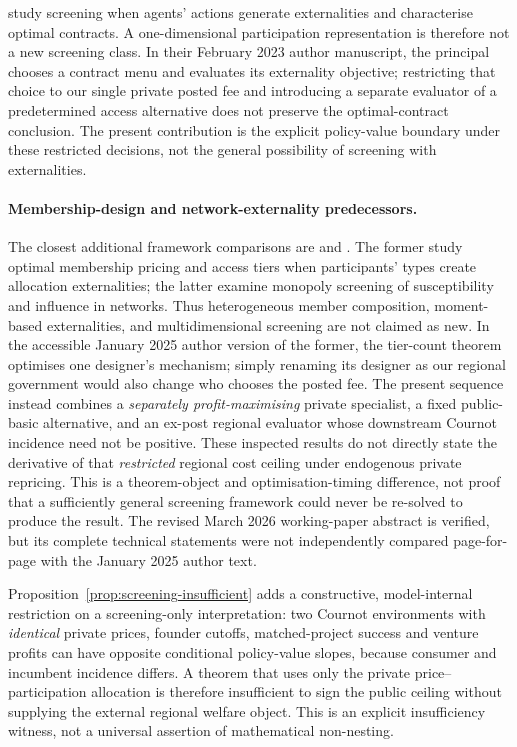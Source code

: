 \citet{OstrizekSartori2023} study screening when agents' actions generate externalities and characterise optimal contracts. A one-dimensional participation representation is therefore not a new screening class. In their February 2023 author manuscript, the principal chooses a contract menu and evaluates its externality objective; restricting that choice to our single private posted fee and introducing a separate evaluator of a predetermined access alternative does not preserve the optimal-contract conclusion. The present contribution is the explicit policy-value boundary under these restricted decisions, not the general possibility of screening with externalities.

\paragraph{Membership-design and network-externality predecessors.}
The closest additional framework comparisons are \citet{DworczakReuterKominersLee2026} and \citet{ShiXing2020}. The former study optimal membership pricing and access tiers when participants' types create allocation externalities; the latter examine monopoly screening of susceptibility and influence in networks. Thus heterogeneous member composition, moment-based externalities, and multidimensional screening are not claimed as new. In the accessible January 2025 author version of the former, the tier-count theorem optimises one designer's mechanism; simply renaming its designer as our regional government would also change who chooses the posted fee. The present sequence instead combines a \emph{separately profit-maximising} private specialist, a fixed public-basic alternative, and an ex-post regional evaluator whose downstream Cournot incidence need not be positive. These inspected results do not directly state the derivative of that \emph{restricted} regional cost ceiling under endogenous private repricing. This is a theorem-object and optimisation-timing difference, not proof that a sufficiently general screening framework could never be re-solved to produce the result. The revised March 2026 working-paper abstract is verified, but its complete technical statements were not independently compared page-for-page with the January 2025 author text.

Proposition~\ref{prop:screening-insufficient} adds a constructive, model-internal restriction on a screening-only interpretation: two Cournot environments with \emph{identical} private prices, founder cutoffs, matched-project success and venture profits can have opposite conditional policy-value slopes, because consumer and incumbent incidence differs. A theorem that uses only the private price--participation allocation is therefore insufficient to sign the public ceiling without supplying the external regional welfare object. This is an explicit insufficiency witness, not a universal assertion of mathematical non-nesting.

